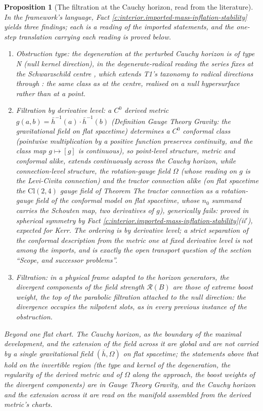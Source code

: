\documentclass[11pt]{article}
\newtheorem{proposition}[theorem]{Proposition}
\theoremstyle{definition}
\theoremstyle{plain}
\newcommand{\changedmark}[2]{\marginpar{\raggedright\scriptsize\color{#1}#2}}
\providecommand{\Cl}{}\renewcommand{\Cl}{\mathrm{Cl}}
\providecommand{\hb}{}\renewcommand{\hb}{\bar{h}}
\providecommand{\nO}{}\renewcommand{\nO}{n_0}
\begin{document}
\begin{proposition}[The filtration at the Cauchy horizon, read from the literature]\label{c:interior.filtration-cauchy-horizon-read-literature}
\changedmark{BurntOrange}{changed since the deposit}
In the framework's language, Fact \ref{c:interior.imported-mass-inflation-stability} yields three findings; each is a reading of the imported statements, and the one-step translation carrying each reading is proved below.
\begin{enumerate}
\item \emph{Obstruction type:} the degeneration at the perturbed Cauchy horizon is of type N (null kernel direction), in the degenerate-radical reading the series fixes at the Schwarzschild centre \cite[Prop.~3.1]{ButlerT5}, which extends T1's taxonomy \cite[Def.~3.1]{ButlerT1} to radical directions through \cite[Thm.~4.4, Cor.~4.5]{ButlerT4}: the same class as at the centre, realised on a null hypersurface rather than at a point.
\item \emph{Filtration by derivative level:} a $C^0$ derived metric $g(a,b) = \hb^{-1}(a) \cdot \hb^{-1}(b)$ (Definition \emph{Gauge Theory Gravity: the gravitational field on flat spacetime}) determines a $C^0$ conformal class (pointwise multiplication by a positive function preserves continuity, and the class map $g \mapsto [g]$ is continuous), so point-level structure, metric and conformal alike, extends continuously across the Cauchy horizon, while connection-level structure, the rotation-gauge field $\Omega$ (whose reading on $g$ is the Levi-Civita connection) and the tractor connection alike (on flat spacetime the $\Cl(2,4)$ gauge field of Theorem \emph{The tractor connection as a rotation-gauge field of the conformal model on flat spacetime}, whose $\nO$ summand carries the Schouten map, two derivatives of $g$), generically fails: proved in spherical symmetry by Fact \ref{c:interior.imported-mass-inflation-stability}(ii$'$), expected for Kerr. The ordering is by derivative level; a strict separation of the conformal description from the metric one at fixed derivative level is not among the imports, and is exactly the open transport question of the section ``Scope, and successor problems''.
\item \emph{Filtration:} in a physical frame adapted to the horizon generators, the divergent components of the field strength $\mathcal{R}(B)$ are those of extreme boost weight, the top of the parabolic filtration attached to the null direction: the divergence occupies the nilpotent slots, as in every previous instance of the obstruction.
\end{enumerate}
\emph{Beyond one flat chart.} The Cauchy horizon, as the boundary of the maximal development, and the extension of the field across it are global and are not carried by a single gravitational field $(\hb, \Omega)$ on flat spacetime; the statements above that hold on the invertible region (the type and kernel of the degeneration, the regularity of the derived metric and of $\Omega$ along the approach, the boost weights of the divergent components) are in Gauge Theory Gravity, and the Cauchy horizon and the extension across it are read on the manifold assembled from the derived metric's charts.
\end{proposition}
\end{document}
